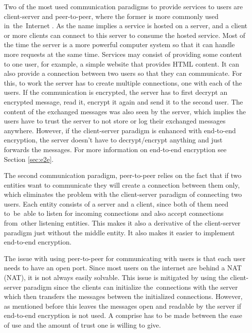 Two of the most used communication paradigms to provide services to users are client-server and peer-to-peer, where the former is more commonly used in~the~Internet \cite{Forouzan2010}. As the name implies a service is hosted on a server, and a client or more clients can connect to this server to consume the hosted service. Most of the time the server is a more powerful computer system so that it can handle more requests at the same time. Services may consist of providing some content to one user, for example, a simple website that provides HTML content. It can also provide a connection between two users so that they can communicate. For this, to work the server has to create multiple connections, one with each of the users. If the communication is encrypted, the server has to first decrypt an encrypted message, read it, encrypt it again and send it to the second user. The content of the exchanged messages was also seen by the server, which implies the users have to trust the server to not store or log their exchanged messages anywhere. However, if the client-server paradigm is enhanced with end-to-end encryption, the server doesn't have to decrypt/encrypt anything and just forwards the messages. For more information on end-to-end encryption see Section \ref{sec:e2e}.

The second communication paradigm, peer-to-peer relies on the fact that if two entities want to communicate they will create a connection between them only, which eliminates the problem with the client-server paradigm of connecting two users. Each entity consists of a server and a client, since both of them need to~be~able to listen for incoming connections and also accept connections from~other listening entities. This makes it also a derivative of the client-server paradigm just without the middle entity. It also makes it easier to implement end-to-end encryption.

The issue with using peer-to-peer for communicating with users is that each user needs to have an open port. Since most users on the internet are behind a NAT (\acl{NAT}), it is not always easily solvable. This issue is mitigated by using the client-server paradigm since the clients can initialize the~connections with the server which then transfers the messages between the initialized connections. However, as mentioned before this leaves the messages open and readable by the server if end-to-end encryption is not used. A comprise has to be made between the ease of use and the amount of trust one is willing to give.
